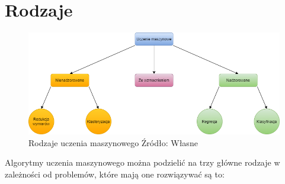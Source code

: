 \section{Rodzaje}
\begin{figure}[h]
    \centering
    \includegraphics[width=1\textwidth]{./Img/typesofLearning.png}
    \caption{Rodzaje uczenia maszynowego Źródło: Własne}
\end{figure}
Algorytmy uczenia maszynowego można podzielić na trzy główne rodzaje w zależności od problemów, które mają one rozwiązywać są to:
